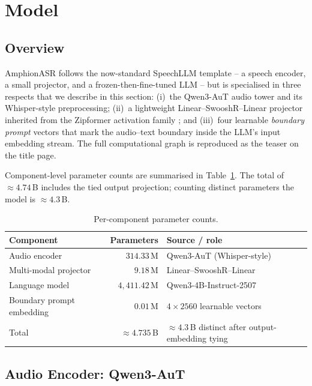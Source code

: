\section{Model}
\label{sec:model}

\subsection{Overview}

AmphionASR follows the now-standard SpeechLLM template
\cite{ma2024slamasr, chu2023qwenaudio, tang2024salmonn} -- a speech
encoder, a small projector, and a frozen-then-fine-tuned LLM -- but is
specialised in three respects that we describe in this section:
(i)~the Qwen3-AuT audio tower and its Whisper-style preprocessing;
(ii)~a lightweight Linear--SwooshR--Linear projector inherited from the
Zipformer activation family \cite{yao2024zipformer}; and
(iii)~four learnable \emph{boundary prompt} vectors that mark the
audio--text boundary inside the LLM's input embedding stream.
The full computational graph is reproduced as the teaser
 on the title page.

Component-level parameter counts are summarised in
Table~\ref{tab:params}. The total of $\approx\!4.74$\,B includes the
tied output projection; counting distinct parameters the model is
$\approx\!4.3$\,B.

\begin{table}[t]
  \caption{Per-component parameter counts.}
  \label{tab:params}
  \centering
  \small
  \begin{tabular}{lrl}
    \toprule
    Component & Parameters & Source / role \\
    \midrule
    Audio encoder              & $314.33$\,M     & Qwen3-AuT (Whisper-style) \\
    Multi-modal projector      & $9.18$\,M       & Linear--SwooshR--Linear \\
    Language model             & $4{,}411.42$\,M & Qwen3-4B-Instruct-2507 \\
    Boundary prompt embedding  & $0.01$\,M       & $4\!\times\!2560$ learnable vectors \\
    \midrule
    Total                      & $\approx 4.735$\,B & $\approx 4.3$\,B distinct after output-embedding tying \\
    \bottomrule
  \end{tabular}
\end{table}

\subsection{Audio Encoder: Qwen3-AuT}
\label{subsec:audio-encoder}


